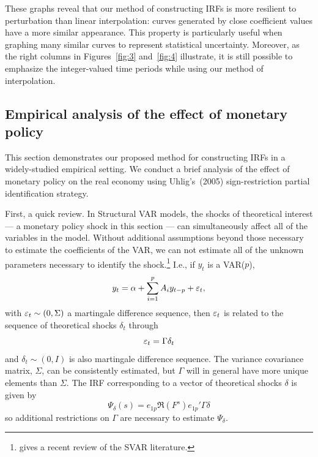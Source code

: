 \documentclass[12pt,fleqn]{article}
\begin{document}
These graphs reveal that our method of constructing IRFs is more
resilient to perturbation than linear interpolation: curves generated
by close coefficient values have a more similar appearance. This
property is particularly useful when graphing many similar curves to
represent statistical uncertainty. Moreover, as the right columns in
Figures~\ref{fig:3} and~\ref{fig:4} illustrate, it is still possible
to emphasize the integer-valued time periods while using our method of
interpolation.

\subsection{Empirical analysis of the effect of monetary policy}
\label{S3.2}

This section demonstrates our proposed method for constructing IRFs
in a widely-studied empirical setting. We conduct a brief analysis of
the effect of monetary policy on the real economy using Uhlig's~(2005)
sign-restriction partial identification strategy.

First, a quick review. In Structural VAR models, the shocks of
theoretical interest --- a monetary policy shock in this section ---
can simultaneously affect all of the variables in the model. Without
additional assumptions beyond those necessary to estimate the
coefficients of the VAR, we can not estimate all of the unknown
parameters necessary to identify the shock.\footnote{%
  \citet{Kil:13} gives a recent review of the SVAR literature.} %
I.e., if $y_t$ is a VAR($p$),
\begin{equation}
  \label{eq:13}
  y_t = \alpha + \sum_{i=1}^p A_i y_{t-p} + \varepsilon_t,
\end{equation}
with $\varepsilon_t \sim (0, \Sigma)$ a martingale difference sequence, then
$\varepsilon_t$ is related to the sequence of theoretical shocks $\delta_t$
through
\begin{equation*}
  \varepsilon_t = \Gamma \delta_t
\end{equation*}
and $\delta_t \sim (0, I)$ is also martingale difference sequence. The
variance covariance matrix, $\Sigma$, can be consistently estimated,
but $\Gamma$ will in general have more unique elements than $\Sigma$.
The IRF corresponding to a vector of theoretical shocks $\delta$ is
given by
\begin{equation}
  \label{eq:14}
  \Psi_\delta(s) = e_{1p} \Re(F^s) e_{1p}' \Gamma \delta
\end{equation}
so additional restrictions on $\Gamma$ are necessary to estimate
$\Psi_\delta$.
\end{document}
